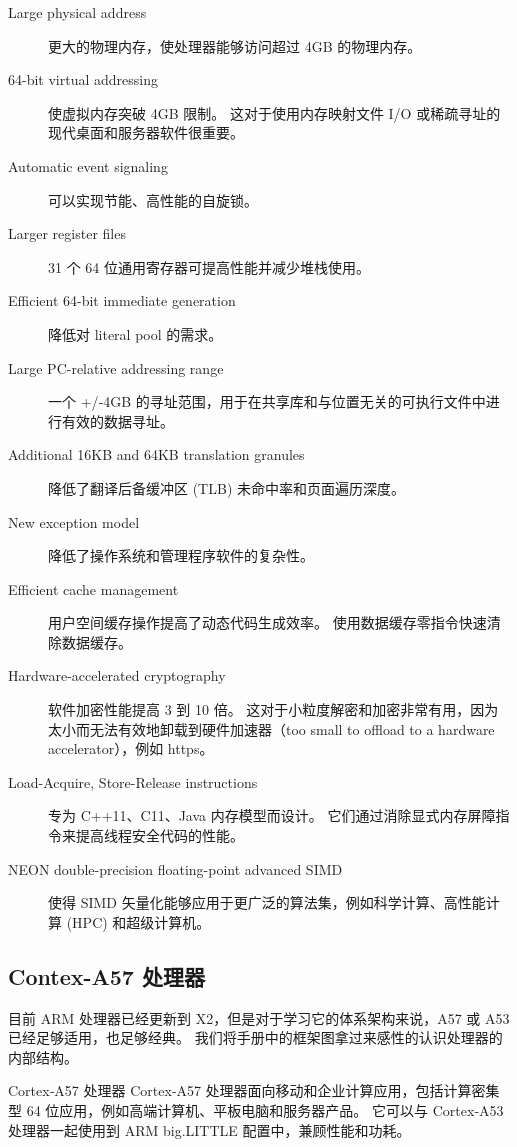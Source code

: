 \begin{description}
    \item[Large physical address] 更大的物理内存，使处理器能够访问超过 4GB 的物理内存。
    \item[64-bit virtual addressing] 使虚拟内存突破 4GB 限制。
    这对于使用内存映射文件 I/O 或稀疏寻址的现代桌面和服务器软件很重要。
    \item[Automatic event signaling] 可以实现节能、高性能的自旋锁。
    \item[Larger register files] 31 个 64 位通用寄存器可提高性能并减少堆栈使用。
    \item[Efficient 64-bit immediate generation] 降低对 literal pool 的需求。
    \item[Large PC-relative addressing range] 一个 +/‑4GB 的寻址范围，用于在共享库和与位置无关的可执行文件中进行有效的数据寻址。
    \item[Additional 16KB and 64KB translation granules] 降低了翻译后备缓冲区 (TLB) 未命中率和页面遍历深度。
    \item[New exception model] 降低了操作系统和管理程序软件的复杂性。
    \item[Efficient cache management] 用户空间缓存操作提高了动态代码生成效率。
    使用数据缓存零指令快速清除数据缓存。
    \item[Hardware-accelerated cryptography] 软件加密性能提高 3 到 10 倍。
      这对于小粒度解密和加密非常有用，因为太小而无法有效地卸载到硬件加速器（too small to offload to a hardware accelerator），例如 https。
    \item[Load-Acquire, Store-Release instructions] 专为 C++11、C11、Java 内存模型而设计。
    它们通过消除显式内存屏障指令来提高线程安全代码的性能。
    \item[NEON double-precision floating-point advanced SIMD] 使得 SIMD 矢量化能够应用于更广泛的算法集，例如科学计算、高性能计算 (HPC) 和超级计算机。
\end{description}

\subsection{Contex-A57 处理器}

目前 ARM 处理器已经更新到 X2，但是对于学习它的体系架构来说，A57 或 A53 已经足够适用，也足够经典。
我们将手册中的框架图拿过来感性的认识处理器的内部结构。

Cortex‑A57 处理器 Cortex‑A57 处理器面向移动和企业计算应用，包括计算密集型 64 位应用，例如高端计算机、平板电脑和服务器产品。
它可以与 Cortex‑A53 处理器一起使用到 ARM big.LITTLE 配置中，兼顾性能和功耗。

